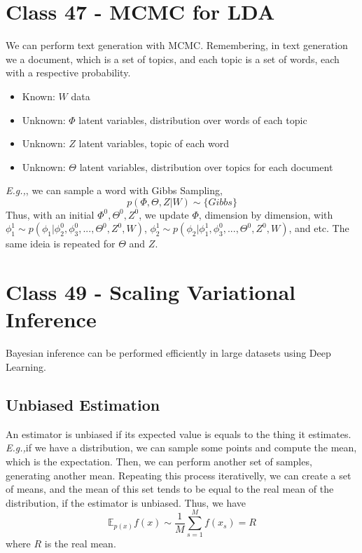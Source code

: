 \documentclass{article}
\newcommand{\Eg}{\textit{E.g.,}}
\begin{document}
\section{Class 47 - MCMC for LDA}
We can perform text generation with MCMC. Remembering, in text generation we a document, which is a set of topics, and each topic is a set of words, each with a respective probability.
\begin{itemize}
    \item Known: $W$ data
    \item Unknown: $\Phi$ latent variables, distribution over words of each topic
    \item Unknown: $Z$ latent variables, topic of each word
    \item Unknown: $\Theta$ latent variables, distribution over topics for each document
\end{itemize}
\Eg, we can sample a word with Gibbs Sampling, 
\begin{equation}
    p(\Phi, \Theta, Z| W) \sim \{Gibbs\}
\end{equation}
Thus, with an initial $\Phi^0, \Theta^0, Z^0$, we update $\Phi$, dimension by dimension, with $\phi_1^1 \sim p(\phi_1|\phi_2^0, \phi_3^0, ..., \Theta^0, Z^0, W)$, $\phi_2^1 \sim p(\phi_2|\phi_1^1, \phi_3^0, ..., \Theta^0, Z^0, W)$, and etc. The same ideia is repeated for $\Theta$ and $Z$.

\section{Class 49 - Scaling Variational Inference}
Bayesian inference can be performed efficiently in large datasets using Deep Learning.
\subsection{Unbiased Estimation}
An estimator is unbiased if its expected value is equals to the thing it estimates. \Eg if we have a distribution, we can sample some points and compute the mean, which is the expectation. Then, we can perform another set of samples, generating another mean. Repeating this process iterativelly, we can create a set of means, and the mean of this set tends to be equal to the real mean of the distribution, if the estimator is unbiased. Thus, we have
\begin{equation}
    \mathbb{E}_{p(x)}f(x) \sim \frac{1}{M} \sum_{s=1}^M f(x_s) = R
\end{equation}
where $R$ is the real mean.
\end{document}

